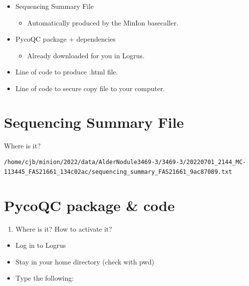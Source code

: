 \documentclass[
]{book}
\providecommand{\tightlist}{%
  \setlength{\itemsep}{0pt}\setlength{\parskip}{0pt}}
\begin{document}
\begin{itemize}
\tightlist
\item
  Sequencing Summary File

  \begin{itemize}
  \tightlist
  \item
    Automatically produced by the MinIon basecaller.
  \end{itemize}
\item
  PycoQC package + dependencies

  \begin{itemize}
  \tightlist
  \item
    Already downloaded for you in Logrus.
  \end{itemize}
\item
  Line of code to produce .html file.
\item
  Line of code to secure copy file to your computer.
\end{itemize}

\hypertarget{sequencing-summary-file}{%
\section{Sequencing Summary File}\label{sequencing-summary-file}}

Where is it?

\begin{verbatim}
/home/cjb/minion/2022/data/AlderNodule3469-3/3469-3/20220701_2144_MC-113445_FAS21661_134c02ac/sequencing_summary_FAS21661_9ac87089.txt
\end{verbatim}

\hypertarget{pycoqc-package-code}{%
\section{PycoQC package \& code}\label{pycoqc-package-code}}

\begin{enumerate}
\def\labelenumi{\arabic{enumi}.}
\tightlist
\item
  Where is it? How to activate it?
\end{enumerate}

\begin{itemize}
\tightlist
\item
  Log in to Logrus
\item
  Stay in your home directory (check with pwd)
\item
  Type the following:
\end{itemize}
\end{document}
